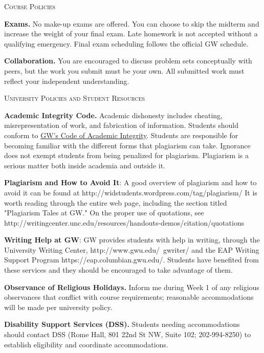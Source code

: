 \documentclass[11pt]{article}
\begin{document}
\bigskip

\noindent\textsc{Course Policies}

\smallskip
\textbf{Exams.} No make-up exams are offered. You can choose to skip the midterm and increase the weight of your final exam. Late homework is not accepted without a qualifying emergency. Final exam scheduling follows the official GW schedule.

\smallskip
\textbf{Collaboration.} You are encouraged to discuss problem sets conceptually with peers, but the work you submit must be your own. All submitted work must reflect your independent understanding.

\bigskip

\noindent\textsc{University Policies and Student Resources}

\smallskip
\textbf{Academic Integrity Code.} Academic dishonesty includes cheating, misrepresentation of work, and fabrication of information. Students should conform to \href{https://students.gwu.edu/code-academic-integrity}{GW’s Code of Academic Integrity}. Students are responsible for becoming familiar with the different forms that plagiarism can take.  Ignorance does not exempt students from being penalized for plagiarism.  Plagiarism is a serious matter both inside academia and outside it.

\smallskip
\textbf{Plagiarism and How to Avoid It}: A good overview of plagiarism and how to avoid it can be found at http://widstudents.wordpress.com/tag/plagiarism/  It is worth reading through the entire web page, including the section titled "Plagiarism Tales at GW."   On the proper use of quotations, see http://writingcenter.unc.edu/resources/handouts-demos/citation/quotations

\smallskip
\textbf{Writing Help at GW}: GW provides students with help in writing, through the University Writing Center, http://www.gwu.edu/~gwriter/ and the EAP Writing Support Program https://eap.columbian.gwu.edu/.  Students have benefited from these services and they should be encouraged to take advantage of them.

\smallskip
\textbf{Observance of Religious Holidays.} Inform me during Week 1 of any religious observances that conflict with course requirements; reasonable accommodations will be made per university policy.

\smallskip
\textbf{Disability Support Services (DSS).} Students needing accommodations should contact DSS (Rome Hall, 801 22nd St NW, Suite 102; 202-994-8250) to establish eligibility and coordinate accommodations.
\end{document}
